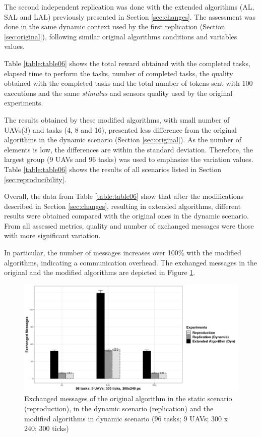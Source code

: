 The second independent replication was done with the extended algorithms (AL, SAL and LAL) previously presented in Section \ref{sec:changes}. The assessment was done in the same dynamic context used by the first replication (Section \ref{sec:original}), following similar original algorithms conditions and variables values.

Table \ref{table:table06} shows the total reward obtained with the completed tasks, elapsed time to perform the tasks, number of completed tasks, the quality obtained with the completed tasks and the total number of tokens sent with 100 executions and the same \textit{stimulus} and sensors quality used by the original experiments.



The results obtained by these modified algorithms, with small number of UAVs(3) and tasks (4, 8 and 16), presented less difference from the original algorithms in the dynamic scenario (Section \ref{sec:original}). As the number of elements is low, the differences are within the standard deviation. Therefore, the largest group (9 UAVs and 96 tasks) was used to emphasize the variation values. Table \ref{table:table06} shows the results of all scenarios listed in Section \ref{sec:reproducibility}.

Overall, the data from Table \ref{table:table06} show that after the modifications described in Section \ref{sec:changes}, resulting in extended algorithms, different results were obtained  compared with the original ones in the dynamic scenario. From all assessed metrics, quality and number of exchanged messages were those with more significant variation.

In particular, the number of messages increases over 100\% with the modified algorithms, indicating a communication overhead. The exchanged messages in the original and the modified algorithms are depicted in Figure \ref{fig:fig06}.

\begin{figure}[h!]
	\begin{center}
		\includegraphics[scale=0.15]{fig/GRAPH06.png}
		\caption{Exchanged messages  of the original algorithm in the static scenario (reproduction), in the dynamic scenario (replication) and the modified algorithms in dynamic scenario (96 tasks; 9 UAVs; 300 x 240; 300 ticks)}
		\label{fig:fig06}
	\end{center}
\end{figure}

